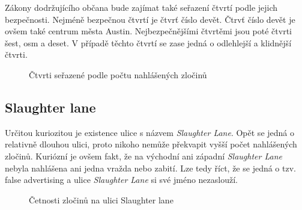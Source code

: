 \documentclass{article}
\begin{document}
Zákony dodržujícího občana bude zajímat také seřazení čtvrtí podle jejich bezpečnosti. Nejméně bezpečnou
čtvrtí je čtvrť číslo devět. Čtrvť číslo devět je ovšem také centrum města Austin. Nejbezpečnějšími
čtvrtěmi jsou poté čtvrti šest, osm a deset. V případě těchto čtvrtí se zase jedná o odlehlejší a
klidnější čtvrti. \cite{austin-districts}

\begin{figure}
  \centering
  \caption{Čtvrti seřazené podle počtu nahlášených zločinů}
  \label{fig:worst_districts}
\end{figure}

\subsection{Slaughter lane}

Určitou kuriozitou je existence ulice s názvem \emph{Slaughter Lane}. Opět se jedná o relativně dlouhou ulici,
proto nikoho nemůže překvapit vyšší počet nahlášených zločinů. Kuriózní je ovšem fakt, že na východní ani západní
\emph{Slaughter Lane} nebyla nahlášena ani jedna vražda nebo zabití. Lze tedy říct, že se jedná o tzv.
false advertising a ulice \emph{Slaughter Lane} si své jméno nezaslouží.

\begin{figure}
  \centering
  \caption{Četnosti zločinů na ulici Slaughter lane}
\end{figure}
\end{document}
